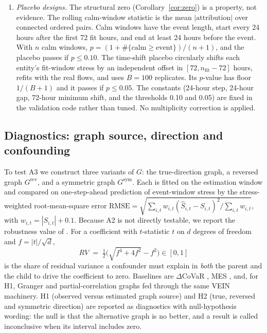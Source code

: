 \documentclass[referee,pdflatex,sn-mathphys-ay]{sn-jnl}
\theoremstyle{thmstyleone}%
\theoremstyle{thmstyletwo}%
\theoremstyle{thmstylethree}%
\begin{document}
\begin{enumerate}[label=(\alph*),leftmargin=*]
entity-hours of z-scored stress, following the out-of-sample convention of \citet{campbell2008predicting}.
The network gain over the own lag is $1-\mathrm{SSE}(m)/\mathrm{SSE}(\mathrm{AR})$. The models are
an AR(1) own lag, the network equation of \eqref{eq:fi} without an own lag, and AR plus network.
\item \emph{Placebo designs.} The structural zero (Corollary~\ref{cor:zero}) is a property, not evidence.
The rolling calm-window statistic is the mean $|\text{attribution}|$ over connected ordered pairs.
Calm windows have the event length, start every 24 hours after the first 72 fit hours, and
end at least 24 hours before the event. With $n$ calm windows, $p=(1+\#\{\text{calm}\ge\text{event}\})/(n+1)$,
and the placebo passes if $p\le0.10$. The time-shift placebo circularly shifts each entity's fit-window stress by an
independent offset in $[72, n_{\text{fit}}-72]$ hours, refits with the real flows, and uses
$B=100$ replicates. Its $p$-value has floor $1/(B+1)$ and it passes if $p\le0.05$. The constants
(24-hour step, 24-hour gap, 72-hour minimum shift, and the thresholds 0.10 and 0.05)
are fixed in the validation code rather than tuned. No multiplicity correction is applied.
\end{enumerate}

\subsection{Diagnostics: graph source, direction and confounding}
\label{subsec:design}
To test A3 we construct three variants of $G$: the true-direction graph, a reversed graph
$G^{\mathrm{rev}}$, and a symmetric graph $G^{\mathrm{sym}}$. Each is fitted on the
estimation window and compared on one-step-ahead prediction of event-window stress by the
stress-weighted root-mean-square error $\mathrm{RMSE}=\sqrt{\sum_{i,t} w_{i,t}(\hat S_{i,t}-S_{i,t})^2/\sum_{i,t} w_{i,t}}$,
with $w_{i,t}=|S_{i,t}|+0.1$. Because A2 is not directly testable, we report the robustness
value of \citet{cinelli2020sensitivity}. For a coefficient with $t$-statistic $t$ on $d$
degrees of freedom and $f=|t|/\sqrt{d}$,
\begin{equation}
\label{eq:rv}
RV \;=\; \tfrac{1}{2}\Big(\sqrt{f^4+4f^2}-f^2\Big)\in[0,1]
\end{equation}
is the share of residual variance a confounder must explain in \emph{both} the parent and
the child to drive the coefficient to zero. Baselines are $\Delta$CoVaR \citep{adrian2016covar}, MES \citep{acharya2017measuring},
and, for H1, Granger and partial-correlation graphs \citep{granger1969,giudici2018corisk}
fed through the same VEIN machinery. H1 (observed versus estimated graph source) and H2 (true, reversed
and symmetric direction) are reported as diagnostics with null-hypothesis wording: the null is that the
alternative graph is no better, and a result is called inconclusive when its interval includes zero.
\end{document}
